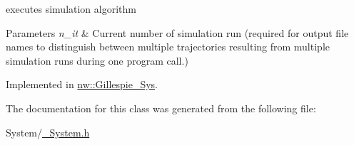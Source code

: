 executes simulation algorithm 


\begin{DoxyParams}{Parameters}
{\em n\+\_\+it} & Current number of simulation run (required for output file names to distinguish between multiple trajectories resulting from multiple simulation runs during one program call.) \\
\hline
\end{DoxyParams}


Implemented in \hyperlink{classnw_1_1_gillespie___sys_ad21aa35a51bac13fe64dc6d838e77aee}{nw\+::\+Gillespie\+\_\+\+Sys}.



The documentation for this class was generated from the following file\+:\begin{DoxyCompactItemize}
\item 
System/\hyperlink{___system_8h}{\+\_\+\+System.\+h}\end{DoxyCompactItemize}
